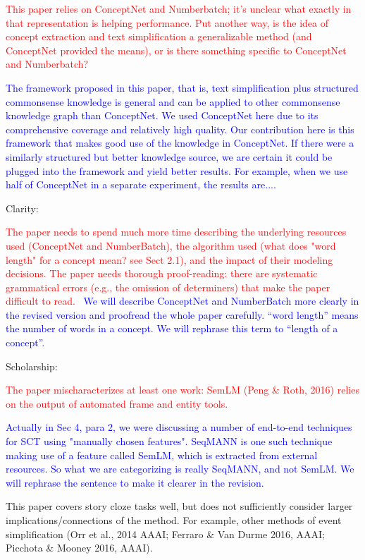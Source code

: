 \documentclass{article}
\newcommand{\shanshan}[1]{\textcolor{blue}{ #1}}
\newcommand{\ssemp}[1]{\textcolor{red}{ #1}}
\begin{document}
 \ssemp{This paper relies on ConceptNet and Numberbatch; it's unclear what exactly in that representation is helping performance. Put another way, is the idea of concept extraction and text simplification a generalizable method (and ConceptNet provided the means), or is there something specific to ConceptNet and Numberbatch?}
 
 \shanshan{The framework proposed in this paper, that is, text simplification plus structured commonsense knowledge is general and can be applied to other commonsense knowledge graph than ConceptNet. We used ConceptNet here due to its comprehensive coverage and relatively high quality. Our contribution here is this framework that makes good use of the knowledge in ConceptNet. If there were a similarly structured but better knowledge source, we are certain it could be plugged into the framework and yield better results. For example, when we use half of ConceptNet in a separate experiment, the results are.... }
		
Clarity:

	\ssemp{The paper needs to spend much more time describing the underlying resources used (ConceptNet and NumberBatch), the algorithm used (what does "word length" for a concept mean? see Sect 2.1), and the impact of their modeling decisions.
	The paper needs thorough proof-reading: there are systematic grammatical errors (e.g., the omission of determiners) that make the paper difficult to read.} 
	\shanshan{We will describe ConceptNet and NumberBatch more clearly in the revised version and proofread the whole paper carefully. 
``word length'' means the number of words in a concept. We will rephrase this term to ``length of a concept''.}

Scholarship:

\ssemp{The paper mischaracterizes at least one work: SemLM (Peng \& Roth, 2016) relies on the output of automated frame and entity tools.}	

\shanshan{Actually in Sec 4, para 2, we were discussing a number of end-to-end techniques for SCT using "manually chosen features". 
SeqMANN is one such technique making use of a feature called SemLM, which is extracted from external resources. So what we are categorizing is
really SeqMANN, and not SemLM. We will rephrase the sentence to make it clearer in the revision.}  

This paper covers story cloze tasks well, but does not sufficiently consider larger implications/connections of the method. For example, other methods of event simplification (Orr et al., 2014 AAAI; Ferraro \& Van Durme 2016, AAAI; Picchota \& Mooney 2016, AAAI).
\end{document}
